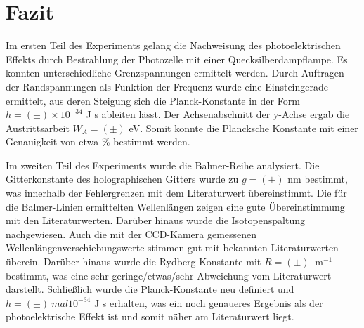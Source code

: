 \chapter{Fazit}

Im ersten Teil des Experiments gelang die Nachweisung des photoelektrischen Effekts durch Bestrahlung der Photozelle mit einer Quecksilberdampflampe. Es konnten unterschiedliche Grenzspannungen ermittelt werden. Durch Auftragen der Randspannungen als Funktion der Frequenz wurde eine Einsteingerade ermittelt, aus deren Steigung sich die Planck-Konstante in der Form \( h = ( \pm ) \times 10^{-34} \) J s ableiten lässt. Der Achsenabschnitt der y-Achse ergab die Austrittsarbeit \( W_A = ( \pm ) \) eV. Somit konnte die Plancksche Konstante mit einer Genauigkeit von etwa  \% bestimmt werden.

Im zweiten Teil des Experiments wurde die Balmer-Reihe analysiert. Die Gitterkonstante des holographischen Gitters wurde zu \(g = ( \pm ) \) nm bestimmt, was innerhalb der Fehlergrenzen mit dem Literaturwert übereinstimmt. Die für die Balmer-Linien ermittelten Wellenlängen zeigen eine gute Übereinstimmung mit den Literaturwerten. Darüber hinaus wurde die Isotopenspaltung nachgewiesen. Auch die mit der CCD-Kamera gemessenen Wellenlängenverschiebungswerte stimmen gut mit bekannten Literaturwerten überein. Darüber hinaus wurde die Rydberg-Konstante mit \(R = ( \pm ) \ \) m\(^{-1}\) bestimmt, was eine sehr geringe/etwas/sehr Abweichung vom Literaturwert darstellt. Schließlich wurde die Planck-Konstante neu definiert und \( h = ( \pm ) \ mal 10^{-34} \) J s erhalten, was ein noch genaueres Ergebnis als der photoelektrische Effekt ist und somit näher am Literaturwert liegt.